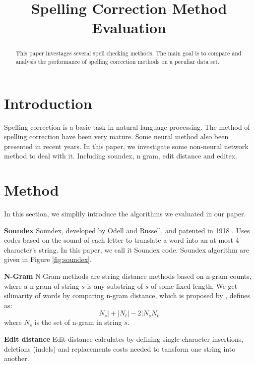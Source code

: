 \documentclass[11pt]{article}
\title{Spelling Correction Method Evaluation}
\begin{document}
\maketitle


\begin{abstract}

This paper investages several spell checking methods. The main goal is to compare and analysis the performance of spelling correction methods on a peculiar data set.

\end{abstract}

\section{Introduction}

Spelling correction is a basic task in natural language processing. The method of spelling correction have been very mature. Some neural method also been presented in recent years. In this paper, we investigate some non-neural network method to deal with it. Including soundex, n gram, edit distance and editex.


\section{Method}

In this section, we simplily introduce the algorithms we evaluated in our paper. 

\noindent\textbf{Soundex} Soundex, developed by Odell and Russell, and patented in 1918 \cite{Hall1980ApproximateSM}. Uses codes based on the sound of each letter to translate a word into an at most 4 character's string. In this paper, we call it Soundex code. Soundex algorithm are given in Figure \ref{fig:soundex}.

\noindent\textbf{N-Gram} N-Gram methods are string distance methods based on n-gram counts, where a n-gram of string $s$ is any substring of $s$ of some fixed length. We get silimarity of words by comparing n-gram distance, which is proposed by \cite{Ukkonen1992ApproximateSM}, defines as:
\begin{equation}
|N_{s}|+|N_{t}|-2|N_{s}N_{t}|
\end{equation}
where $N_{s}$ is the set of n-gram in string $s$. 

\noindent\textbf{Edit distance} Edit distance calculates by defining single character insertions, deletions (indels) and replacements costs  needed to tansform one string into another. 
\end{document}
